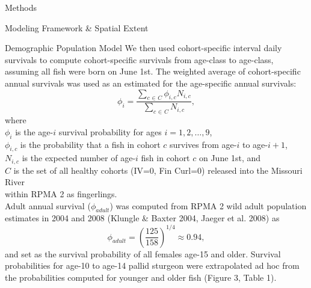 \documentclass[12pt]{article}
\begin{document}
\begin{section}{Methods}
\begin{subsection}{Modeling Framework \& Spatial Extent}
\begin{subsubsection}{Demographic Population Model}
We then used cohort-specific interval daily survivals to compute cohort-specific survivals from age-class to age-class, assuming all fish were born on June 1st.  The weighted average of cohort-specific annual survivals was used as an estimated for the age-specific annual survivals:
\begin{equation}
\phi_i=\frac{\displaystyle\sum_{c \hspace{1pt} \in \hspace{1pt} C} \phi_{i,c}N_{i,c}}{\displaystyle\sum_{c \hspace{1pt} \in \hspace{1pt} C} N_{i,c}},
\end{equation} 
where\\
\hspace*{0.5cm}$\phi_i$ is the age-$i$ survival probability for ages $i=1, 2, \ldots, 9$,\\
\hspace*{0.5cm}$\phi_{i,c}$ is the probability that a fish in cohort $c$ survives from age-$i$ to age-$i+1$,\\ 
\hspace*{0.5cm}$N_{i,c}$ is the expected number of age-$i$ fish in cohort $c$ on June 1st, and\\
\hspace*{0.5cm}$C$ is the set of all healthy cohorts (IV=0, Fin Curl=0) released into the Missouri River\\ 
\hspace*{1.5cm}within RPMA 2 as fingerlings.\\

Adult annual survival ($\phi_{adult}$) was computed from RPMA 2 wild adult population estimates in 2004 and 2008 (Klungle \& Baxter 2004, Jaeger et al. 2008) as
\begin{equation}
\phi_{adult}=\left(\frac{125}{158}\right)^{1/4}\approx 0.94,
\end{equation}
and set as the survival probability of all females age-15 and older.  Survival probabilities for age-10 to age-14 pallid sturgeon were extrapolated ad hoc from the probabilities computed for younger and older fish (Figure 3, Table 1).\\

  




\end{subsubsection}
\end{subsection}
\end{section}
\end{document}
